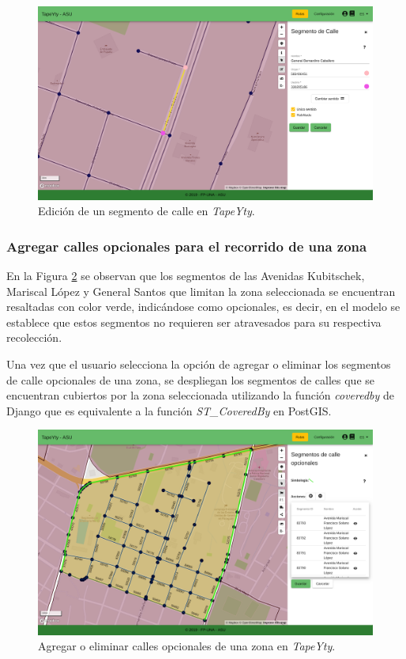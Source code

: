 \begin{figure}[H]
\centerline{\includegraphics[width=\textwidth]{edicionCalle.png}}
\caption{Edición de un segmento de calle en \textit{TapeYty}.}
\label{fig:edicionCalles}
\end{figure}

\subsubsection{Agregar calles opcionales para el recorrido de una zona}

En la Figura \ref{fig:callesOpcionales} se observan que los segmentos de las Avenidas Kubitschek, Mariscal López y General Santos que limitan la zona seleccionada se encuentran resaltadas con color verde, indicándose como opcionales, es decir, en el modelo se establece que estos segmentos no requieren ser atravesados para su respectiva recolección.

Una vez que el usuario selecciona la opción de agregar o eliminar los segmentos de calle opcionales de una zona, se despliegan los segmentos de calles que se encuentran cubiertos por la zona seleccionada utilizando la función \textit{coveredby} de Django que es equivalente a la función \textit{ST\_CoveredBy} en PostGIS.

\begin{figure}[H]
\centerline{\includegraphics[width=\textwidth]{callesOpcionales.png}}
\caption{Agregar o eliminar calles opcionales de una zona en \textit{TapeYty}.}
\label{fig:callesOpcionales}
\end{figure}

